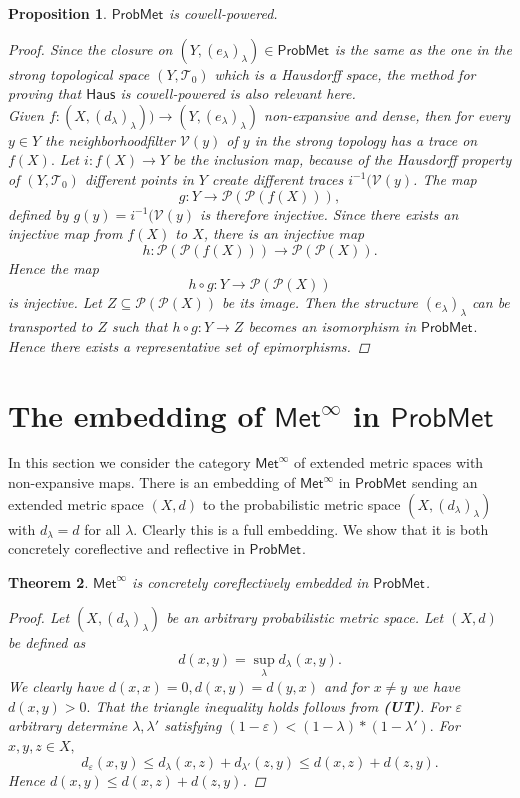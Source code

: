 \documentclass[12pt,a4paper]{amsart}
\theoremstyle{theorem}
\newtheorem{theorem}{Theorem}[section]
\newtheorem{proposition}[theorem]{Proposition}
\theoremstyle{definition}
\newcommand{\ppp}{\ensuremath{\mathcal{P}}}
\newcommand{\ttt}{\ensuremath{\mathcal{T}}}
\newcommand{\vvv}{\ensuremath{\mathcal{V}}}
\newcommand{\PM}{\ensuremath{\mathsf{ProbMet_{}}}}
\newcommand{\met}{\ensuremath{\mathsf{Met}}}
\newcommand{\ve}{\ensuremath{\varepsilon}}
\renewcommand{\l}{\ensuremath{\lambda}}
\def\rw{\rightarrow}
\begin{document}
{\begin{proposition}
$\PM$ is cowell-powered.
\begin{proof}
Since the closure on $(Y, (e_\l )_\l) \in \PM$ is the same as the one in the strong topological space $(Y, \ttt_0)$ which is a Hausdorff space, the method for proving that $\mathsf{Haus}$ is cowell-powered \cite{P} is also relevant here. \\

Given $f: (X, (d_\l )_\l)) \rw (Y, (e_\l )_\l)$ non-expansive and dense, then for every $y \in Y$ the neighborhoodfilter $\vvv(y)$ of $y$ in the strong topology has a trace on $f(X).$ 
Let $i: f(X) \rw Y$ be the inclusion map, because of the Hausdorff property of $(Y, \ttt_0)$ different points in $Y$ create different traces $i^{-1} (\vvv(y)$.  
The map
$$
g: Y \rw \ppp(\ppp(f(X))),
$$
 defined by $g(y) = i^{-1} (\vvv(y)$ is therefore injective. Since there exists an injective map from $f(X)$ to $X$, there is an injective map
$$
h: \ppp(\ppp(f(X))) \rw \ppp(\ppp(X)).
$$
Hence the map 
$$
h \circ g: Y \rw \ppp(\ppp(X))
$$
is injective. Let $Z \subseteq \ppp(\ppp(X))$ be its image. Then the structure $(e_\l)_\l$ can be transported to $Z$ such that $h \circ g: Y  \rw Z$
becomes an isomorphism in $\PM.$ Hence there exists a representative set of epimorphisms.
\end{proof}

\end{proposition}


\section{The embedding of $\mathsf{Met}^\infty$ in $\PM$} 

In this section we consider the category $\met^\infty$ of extended metric spaces with non-expansive maps.
There is an embedding of $\met^\infty$ in $\PM$ sending an extended metric space $(X,d)$ to the probabilistic metric space $(X, (d_\l)_\l)$ with $d_\l = d$ for all $\l.$ Clearly this is a full embedding. We show that it is both concretely coreflective and reflective in $\PM$.

\begin{theorem}
$\met^\infty$ is concretely coreflectively embedded in $\PM$.
\begin{proof}
Let $(X, (d_\l)_\l)$ be an arbitrary probabilistic metric space. Let $(X,d)$ be defined as 
$$
d(x,y) = \sup_\l d_\l(x,y).
$$
We clearly have $d(x,x) = 0, d(x,y) = d(y,x)$ and for $x \not = y$ we have $d(x,y) >0.$
That the triangle inequality holds follows from {\bf(UT)}.
For $\ve$ arbitrary determine $\l, \l'$ satisfying $(1-\ve) < (1-\l) * (1-\l').$ For $x,y,z \in X,$
$$
d_\ve(x,y) \leq d_\l(x,z) + d_{\l'} (z,y) \leq d(x,z) + d(z,y).
$$
Hence $d(x,y) \leq d(x,z) + d(z,y)$.


\end{proof}
\end{theorem}}
\end{document}
